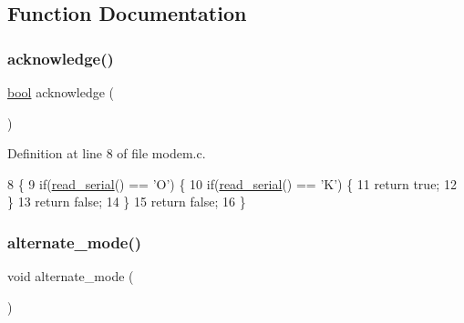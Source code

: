 \subsection{Function Documentation}
\mbox{\label{a00038_a8529dba543149138317e327931bf5a5c_a8529dba543149138317e327931bf5a5c}} 
\subsubsection{\texorpdfstring{acknowledge()}{acknowledge()}}
{\footnotesize\ttfamily \hyperlink{a00134_af6a258d8f3ee5206d682d799316314b1_af6a258d8f3ee5206d682d799316314b1}{bool} acknowledge (\begin{DoxyParamCaption}{ }\end{DoxyParamCaption})}



Definition at line 8 of file modem.\+c.


\begin{DoxyCode}
8                    \{
9     \textcolor{keywordflow}{if}(\hyperlink{a00050_ad343a7018f74662f794968dfa0523841_ad343a7018f74662f794968dfa0523841}{read\_serial}() == \textcolor{charliteral}{'O'}) \{
10         \textcolor{keywordflow}{if}(\hyperlink{a00050_ad343a7018f74662f794968dfa0523841_ad343a7018f74662f794968dfa0523841}{read\_serial}() == \textcolor{charliteral}{'K'}) \{
11             \textcolor{keywordflow}{return} \textcolor{keyword}{true};
12         \}
13         \textcolor{keywordflow}{return} \textcolor{keyword}{false};
14     \}
15     \textcolor{keywordflow}{return} \textcolor{keyword}{false};
16 \}
\end{DoxyCode}
\mbox{\label{a00038_ace378eaa88c0b7f0cdafe97d064e36fb_ace378eaa88c0b7f0cdafe97d064e36fb}} 
\subsubsection{\texorpdfstring{alternate\+\_\+mode()}{alternate\_mode()}}
{\footnotesize\ttfamily void alternate\+\_\+mode (\begin{DoxyParamCaption}{ }\end{DoxyParamCaption})}



